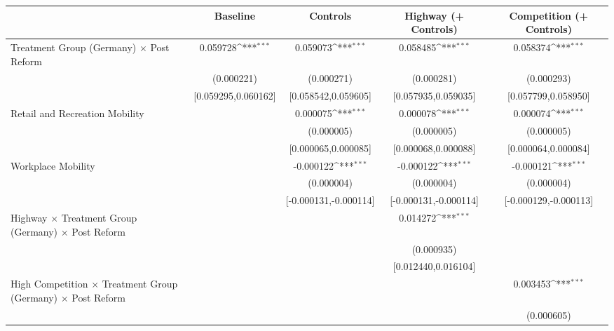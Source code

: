 {
\def\sym#1{\ifmmode^{#1}\else\(^{#1}\)\fi}
\begin{tabular}{l*{4}{c}}
\toprule
                    &\multicolumn{1}{c}{Baseline}&\multicolumn{1}{c}{Controls}&\multicolumn{1}{c}{Highway (+ Controls)}&\multicolumn{1}{c}{Competition (+ Controls)}\\
\midrule
Treatment Group (Germany) $\times$ Post Reform&    0.059728\sym{***}&    0.059073\sym{***}&    0.058485\sym{***}&    0.058374\sym{***}\\
                    &  (0.000221)         &  (0.000271)         &  (0.000281)         &  (0.000293)         \\
                    &[0.059295,0.060162]         &[0.058542,0.059605]         &[0.057935,0.059035]         &[0.057799,0.058950]         \\
Retail and Recreation Mobility&                     &    0.000075\sym{***}&    0.000078\sym{***}&    0.000074\sym{***}\\
                    &                     &  (0.000005)         &  (0.000005)         &  (0.000005)         \\
                    &                     &[0.000065,0.000085]         &[0.000068,0.000088]         &[0.000064,0.000084]         \\
Workplace Mobility  &                     &   -0.000122\sym{***}&   -0.000122\sym{***}&   -0.000121\sym{***}\\
                    &                     &  (0.000004)         &  (0.000004)         &  (0.000004)         \\
                    &                     &[-0.000131,-0.000114]         &[-0.000131,-0.000114]         &[-0.000129,-0.000113]         \\
Highway $\times$ Treatment Group (Germany) $\times$ Post Reform&                     &                     &    0.014272\sym{***}&                     \\
                    &                     &                     &  (0.000935)         &                     \\
                    &                     &                     &[0.012440,0.016104]         &                     \\
High Competition $\times$ Treatment Group (Germany) $\times$ Post Reform&                     &                     &                     &    0.003453\sym{***}\\
                    &                     &                     &                     &  (0.000605)         \\

\end{tabular}}
